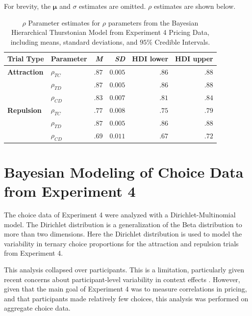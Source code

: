 For brevity, the $\boldsymbol{\mu}$ and $\sigma$ estimates are omitted. $\rho$ estimates are shown below.
\begin{table}[ht]
    \centering
    \begin{tabular}{llrrrr}
        \toprule
        Trial Type & Parameter & \textit{M} & \textit{SD} & HDI lower & HDI upper \\
        \midrule
        \textbf{Attraction}  &  $\rho_{TC}$     &    $.87$   &   $0.005$    &  $.86$     & $.88$     \\
                             &  $\rho_{TD}$    &     $.87$   &   $0.005$    &  $.86$     & $.88$     \\
                             &  $\rho_{CD}$    &     $.83$   &   $0.007$    &  $.81$     & $.84$     \\
        \textbf{Repulsion}   &  $\rho_{TC}$     &    $.77$   &   $0.008$    &  $.75$     & $.79$     \\
                             &  $\rho_{TD}$    &     $.87$   &   $0.005$    &  $.86$     & $.88$     \\
                             &  $\rho_{CD}$    &     $.69$   &   $0.011$     &  $.67$     & $.72$     \\
        \bottomrule
    \end{tabular}
    \caption{$\rho$ Parameter estimates for $\rho$ parameters from the Bayesian Hierarchical Thurstonian Model from Experiment 4 Pricing Data, including means, standard deviations, and $95\%$ Credible Intervals.}
    \label{tab:e4_rho_params}
\end{table}

\chapter{Bayesian Modeling of Choice Data from Experiment 4}

The choice data of Experiment 4 were analyzed with a Dirichlet-Multinomial model. The Dirichlet distribution is a generalization of the Beta distribution to more than two dimensions. Here the Dirichlet distribution is used to model the variability in ternary choice proportions for the attraction and repulsion trials from Experiment 4.

This analysis collapsed over participants. This is a limitation, particularly given recent concerns about participant-level variability in context effects \parencite{liewAppropriacyAveragingStudy2016b,trueblood2015fragile}. However, given that the main goal of Experiment 4 was to measure correlations in pricing, and that participants made relatively few choices, this analysis was performed on aggregate choice data.

